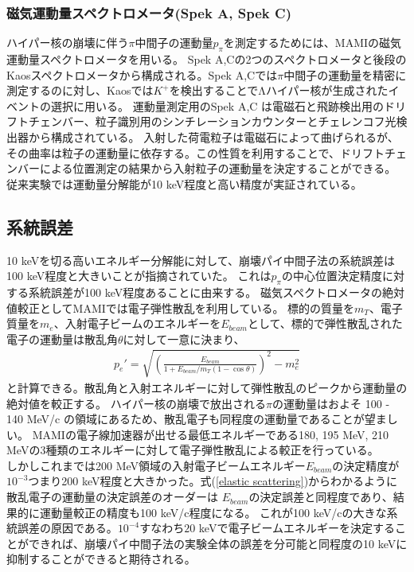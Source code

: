 \documentclass[a4paper,11pt,uplatex]{jsbook}
\begin{document}
\subsubsection{磁気運動量スペクトロメータ(Spek A, Spek C)}
ハイパー核の崩壊に伴う$\pi$中間子の運動量$p_\pi$を測定するためには、MAMIの磁気運動量スペクトロメータを用いる。
Spek A,Cの2つのスペクトロメータと後段のKaosスペクトロメータから構成される。Spek A,Cでは$\pi$中間子の運動量を精密に測定するのに対し、Kaosでは$K^+$を検出することでΛハイパー核が生成されたイベントの選択に用いる。
運動量測定用のSpek A,C は電磁石と飛跡検出用のドリフトチェンバー、粒子識別用のシンチレーションカウンターとチェレンコフ光検出器から構成されている。
入射した荷電粒子は電磁石によって曲げられるが、その曲率は粒子の運動量に依存する。この性質を利用することで、ドリフトチェンバーによる位置測定の結果から入射粒子の運動量を決定することができる。
従来実験では運動量分解能が10 keV程度と高い精度が実証されている。

\subsection{系統誤差}
10 keVを切る高いエネルギー分解能に対して、崩壊パイ中間子法の系統誤差は100 keV程度と大きいことが指摘されていた。
これは$p_\pi$の中心位置決定精度に対する系統誤差が100 keV程度あることに由来する。
磁気スペクトロメータの絶対値較正としてMAMIでは電子弾性散乱を利用している。
標的の質量を$m_T$、電子質量を$m_e$、入射電子ビームのエネルギーを$E_{beam}$として、標的で弾性散乱された電子の運動量は散乱角$\theta$に対して一意に決まり、
\begin{eqnarray}
  p_e' = \sqrt{\left(\frac{E_{beam}}{1 + E_{beam}/m_T(1 - \cos{\theta})} \right)^2 - m_e^2}\label{elastic scattering}
\end{eqnarray}
と計算できる。散乱角と入射エネルギーに対して弾性散乱のピークから運動量の絶対値を較正する。
ハイパー核の崩壊で放出される$\pi$の運動量はおよそ 100 - 140 MeV/c の領域にあるため、散乱電子も同程度の運動量であることが望ましい。
MAMIの電子線加速器が出せる最低エネルギーである180, 195 MeV, 210 MeVの3種類のエネルギーに対して電子弾性散乱による較正を行っている。\\
しかしこれまでは200 MeV領域の入射電子ビームエネルギー$E_{beam}$の決定精度が$10^{-3}$つまり200 keV程度と大きかった。式(\ref{elastic scattering})からわかるように散乱電子の運動量の決定誤差のオーダーは
$E_{beam}$の決定誤差と同程度であり、結果的に運動量較正の精度も100 keV/c程度になる。
これが100 keV/cの大きな系統誤差の原因である。$10^{-4}$すなわち$20$ keVで電子ビームエネルギーを決定することができれば、崩壊パイ中間子法の実験全体の誤差を分可能と同程度の10 keVに抑制することができると期待される。
\end{document}
